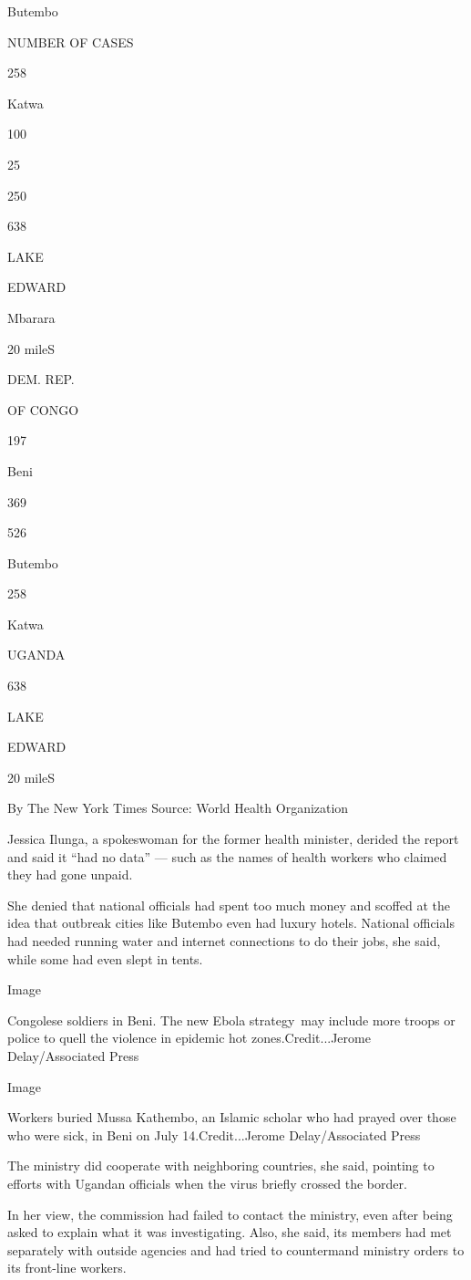 Butembo

NUMBER OF CASES

258

Katwa

100

25

250

638

LAKE

EDWARD

Mbarara

20 mileS

DEM. REP.

OF CONGO

197

Beni

369

526

Butembo

258

Katwa

UGANDA

638

LAKE

EDWARD

20 mileS

By The New York Times \textbar{} Source: World Health Organization

Jessica Ilunga, a spokeswoman for the former health minister, derided
the report and said it ``had no data'' --- such as the names of health
workers who claimed they had gone unpaid.

She denied that national officials had spent too much money and scoffed
at the idea that outbreak cities like Butembo even had luxury hotels.
National officials had needed running water and internet connections to
do their jobs, she said, while some had even slept in tents.

Image

Congolese soldiers in Beni. The new Ebola strategy~may include more
troops or police to quell the violence in epidemic hot
zones.Credit...Jerome Delay/Associated Press

Image

Workers buried Mussa Kathembo, an Islamic scholar who had prayed over
those who were sick, in Beni on July 14.Credit...Jerome Delay/Associated
Press

The ministry did cooperate with neighboring countries, she said,
pointing to efforts with Ugandan officials when the virus briefly
crossed the border.

In her view, the commission had failed to contact the ministry, even
after being asked to explain what it was investigating. Also, she said,
its members had met separately with outside agencies and had tried to
countermand ministry orders to its front-line workers.

